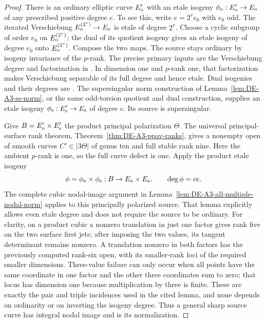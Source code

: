 \begin{proof}
There is an ordinary elliptic curve $E'_{\rm o}$ with an etale isogeny
$\phi_{\rm o}:E'_{\rm o}\to E_{\rm o}$ of any prescribed positive
degree $e$.  To see this, write $e=2^v e_0$ with $e_0$ odd.
The iterated Verschiebung
$E_{\rm o}^{(2^v)}\to E_{\rm o}$ is etale of degree $2^v$.
Choose a cyclic subgroup of order $e_0$ on $E_{\rm o}^{(2^v)}$;
the dual of its quotient isogeny gives an etale isogeny of degree
$e_0$ onto $E_{\rm o}^{(2^v)}$.  Compose the two maps.
The source stays ordinary by isogeny invariance of the $p$-rank.
The precise primary inputs are the Verschiebung degree and
factorization in \cite[Propositions~5.20--5.22 and their proofs,
pp.~80--81]{EdixhovenVanDerGeerMoonenAV}.  In dimension one and
$p$-rank one, that factorization makes Verschiebung separable of
its full degree and hence etale.  Dual isogenies and their degrees
are \cite[Theorem~7.5 and Corollary~7.17, pp.~100,104]
{EdixhovenVanDerGeerMoonenAV}.
The supersingular norm construction of
Lemma~\ref{lem:DE-A3-ss-norm}, or the same odd-torsion quotient and
dual construction, supplies an etale isogeny
$\phi_{\rm s}:E'_{\rm s}\to E_{\rm s}$ of degree $c$.
Its source is supersingular.

Give $B=E'_{\rm o}\times E'_{\rm s}$ the product principal
polarization $\Theta$.  The universal principal-surface rank theorem,
Theorem~\ref{thm:DE-A3-ppav-ranks}, gives a nonempty open of smooth
curves $C'\in|3\Theta|$ of genus ten and full stable rank nine.
Here the ambient $p$-rank is one, so the full curve defect is one.
Apply the product etale isogeny
\[
                 \phi=\phi_{\rm o}\times\phi_{\rm s}:B\to
                       E_{\rm o}\times E_{\rm s},
             \qquad \deg\phi=ce.
\]
The complete cubic nodal-image argument in
Lemma~\ref{lem:DE-A3-all-multiple-nodal-norm} applies to this
principally polarized source.  That lemma explicitly allows even
etale degree and does not require the source to be ordinary.
For clarity, on a product cubic a nonzero translation in just one
factor gives rank five on the two surface first jets; after imposing
the two values, its tangent determinant remains nonzero.  A translation
nonzero in both factors has the previously computed rank-six open,
with its smaller-rank loci of the required smaller dimensions.
Three-value failure can only occur when all points have the same
coordinate in one factor and the other three coordinates sum to zero;
that locus has dimension one because multiplication by three is finite.
These are exactly the pair and triple incidences used in the cited
lemma, and none depends on ordinarity or on inverting the isogeny degree.
Thus a general sharp source curve has integral nodal image and is
its normalization.


\end{proof}
